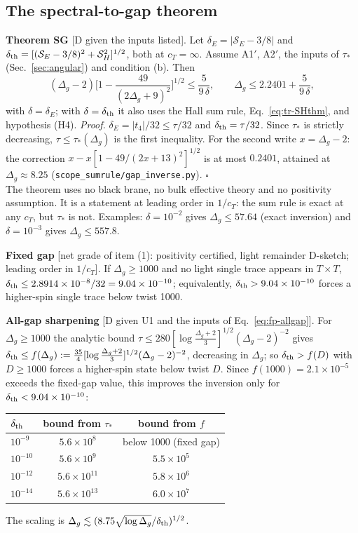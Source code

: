 \subsection{The spectral-to-gap theorem}
\textbf{Theorem SG} [D given the inputs listed]. Let $\delta_E=|\mathcal S_E-3/8|$ and
$\delta_{\rm th}=[(\mathcal S_E-3/8)^2+\mathcal S_H^2]^{1/2}$, both at $c_T=\infty$. Assume A1$'$, A2$'$, the inputs of
$\tau_*$ (Sec.~\ref{sec:angular}) and condition (b). Then
\begin{equation}
(\Delta_g-2)\Big[1-\frac{49}{(2\Delta_g+9)^2}\Big]^{1/2}\le\frac5{9\,\delta},\qquad
\Delta_g\le2.2401+\frac5{9\,\delta},
\label{eq:tr-SG}
\end{equation}
with $\delta=\delta_E$; with $\delta=\delta_{\rm th}$ it also uses the Hall sum rule, Eq.~\eqref{eq:tr-SHthm}, and hypothesis (H4).
\emph{Proof.} $\delta_E=|t_4|/32\le\tau/32$ and $\delta_{\rm th}=\tau/32$. Since $\tau_*$ is strictly decreasing, $\tau\le\tau_*(\Delta_g)$
is the first inequality. For the second write $x=\Delta_g-2$: the correction $x-x[1-49/(2x+13)^2]^{1/2}$ is at most $0.2401$,
attained at $\Delta_g\approx8.25$ (\texttt{scope\_sumrule/gap\_inverse.py}). $\square$\\
The theorem uses no black brane, no bulk effective theory and no positivity assumption. It is a statement at leading order in
$1/c_T$: the sum rule is exact at any $c_T$, but $\tau_*$ is not. Examples: $\delta=10^{-2}$ gives $\Delta_g\le57.64$ (exact
inversion) and $\delta=10^{-3}$ gives $\Delta_g\le557.8$.

\textbf{Fixed gap} [net grade of item (1): positivity certified, light remainder D-sketch; leading order in $1/c_T$]. If $\Delta_g\ge1000$ and no light single trace appears in
$T\times T$, $\delta_{\rm th}\le2.8914\times10^{-8}/32=9.04\times10^{-10}$; equivalently, $\delta_{\rm th}>9.04\times10^{-10}$
forces a higher-spin single trace below twist 1000.

\textbf{All-gap sharpening} [D given U1 and the inputs of Eq.~\eqref{eq:fp-allgap}]. For $\Delta_g\ge1000$ the analytic bound
$\tau\le280[\log\frac{\Delta_g+2}3]^{1/2}(\Delta_g-2)^{-2}$ gives
$\delta_{\rm th}\le f(\Delta_g):=\tfrac{35}4[\log\frac{\Delta_g+2}3]^{1/2}(\Delta_g-2)^{-2}$, decreasing in $\Delta_g$; so
$\delta_{\rm th}>f(D)$ with $D\ge1000$ forces a higher-spin state below twist $D$. Since $f(1000)=2.1\times10^{-5}$ exceeds the
fixed-gap value, this improves the inversion only for $\delta_{\rm th}<9.04\times10^{-10}$:

\begin{center}
\begin{tabular}{lcc}
$\delta_{\rm th}$ & bound from $\tau_*$ & bound from $f$\\\hline
$10^{-9}$ & $5.6\times10^{8}$ & below 1000 (fixed gap)\\
$10^{-10}$ & $5.6\times10^{9}$ & $5.5\times10^{5}$\\
$10^{-12}$ & $5.6\times10^{11}$ & $5.8\times10^{6}$\\
$10^{-14}$ & $5.6\times10^{13}$ & $6.0\times10^{7}$
\end{tabular}
\end{center}
The scaling is $\Delta_g\lesssim(8.75\sqrt{\log\Delta_g}/\delta_{\rm th})^{1/2}$.

